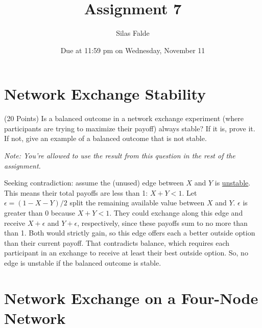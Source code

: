 \documentclass[newpages]{assignment}
\title{Assignment 7}
\author{Silas Falde}
\date{Due at 11:59 pm on Wednesday, November 11}
\begin{document}
\maketitle
\tableofcontents

\section{Network Exchange Stability}

\begin{problem}
    (20 Points) Is a balanced outcome in a network exchange experiment (where participants are trying to maximize their payoff) always stable? If it is, prove it. If not, give an example of a balanced outcome that is not stable.

    \textit{Note: You're allowed to use the result from this question in the rest of the assignment.}
\end{problem}

\begin{solution}
    Seeking contradiction: assume the (unused) edge between \(X\) and \(Y\) is \underline{unstable}. This means their total payoffs are less than 1: \(X+Y<1\). Let \(\epsilon=(1-X-Y)/2\) split the remaining available value between $X$ and $Y$. $\epsilon$ is greater than 0 because $X + Y < 1$. They could exchange along this edge and receive \(X+\epsilon\) and \(Y+\epsilon\), respectively, since these payoffs sum to no more than than 1. Both would strictly gain, so this edge offers each a better outside option than their current payoff. That contradicts balance, which requires each participant in an exchange to receive at least their best outside option. So, no edge is unstable if the balanced outcome is stable.
\end{solution}

\section{Network Exchange on a Four-Node Network}
\end{document}
